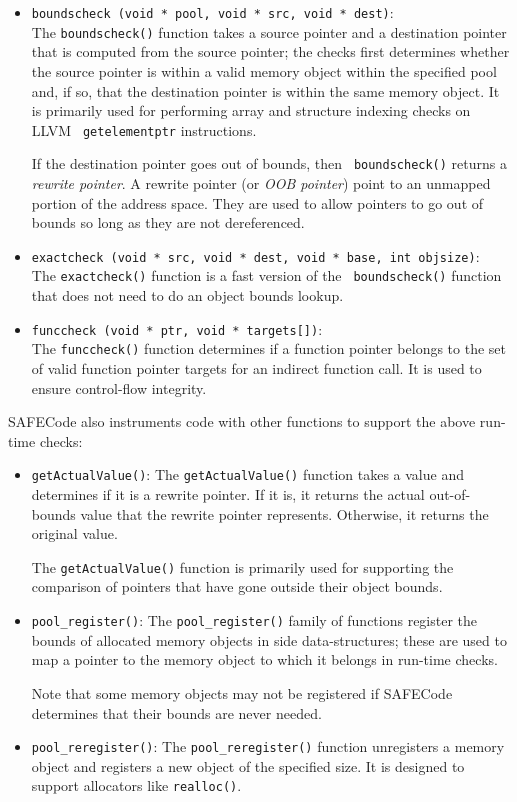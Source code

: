 \begin{itemize}
\item{\tt boundscheck (void * pool, void * src, void * dest)}: \\
The {\tt boundscheck()} function takes a source pointer and a
destination pointer that is computed from the source pointer; the
checks first determines whether the source pointer is within a valid
memory object within the specified pool and, if so, that the
destination pointer is within the same memory object.  It is primarily
used for performing array and structure indexing checks on LLVM {\tt
getelementptr} instructions.

If the destination pointer goes out of bounds, then {\tt
boundscheck()} returns a \emph{rewrite pointer}.  A rewrite pointer
(or \emph{OOB pointer}) point to an unmapped portion of the address
space.  They are used to allow pointers to go out of bounds so long as
they are not dereferenced.

\item{\tt exactcheck (void * src, void * dest, void * base, int
objsize)}: \\
The {\tt exactcheck()} function is a fast version of the {\tt
boundscheck()} function that does not need to do an object bounds
lookup.

\item{\tt funccheck (void * ptr, void * targets[])}: \\
The {\tt funccheck()} function determines if a function pointer
belongs to the set of valid function pointer targets for an indirect
function call.  It is used to ensure control-flow integrity.
\end{itemize}

SAFECode also instruments code with other functions to support the
above run-time checks:

\begin{itemize}
\item{\tt getActualValue()}:
The {\tt getActualValue()} function takes a value and determines if it
is a rewrite pointer.  If it is, it returns the actual out-of-bounds
value that the rewrite pointer represents.  Otherwise, it returns the
original value.

The {\tt getActualValue()} function is primarily used for supporting
the comparison of pointers that have gone outside their object bounds.

\item{\tt pool\_register()}:
The {\tt pool\_register()} family of functions register the bounds of
allocated memory objects in side data-structures; these are used to
map a pointer to the memory object to which it belongs in run-time
checks.

Note that some memory objects may not be registered if SAFECode determines
that their bounds are never needed.

\item{\tt pool\_reregister()}:
The {\tt pool\_reregister()} function unregisters a memory object and
registers a new object of the specified size.  It is designed to
support allocators like {\tt realloc()}.
\end{itemize}
